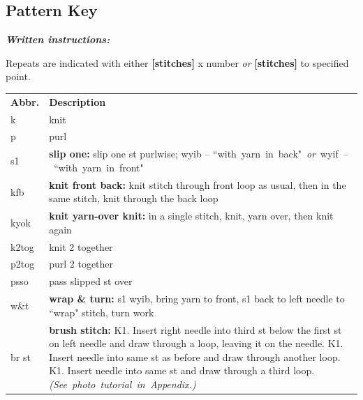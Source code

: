 \documentclass[12pt]{article}
\renewcommand{\arraystretch}{2}
\newcommand{\vocab}[1]{\emph{\textbf{#1}}} %
\begin{document}
\vfill

\subsection*{Pattern Key}

\vocab{Written instructions:} 

Repeats are indicated with either \textbf{[stitches]} x number \emph{or} \textbf{[stitches]} to specified point.
\vspace{-1em}
\small
\begin{center}
{\renewcommand{\arraystretch}{1.5}
\begin{tabular}{| C{0.1\linewidth}  p{0.9\linewidth} | }
\thickhline {} 
\textbf{Abbr.}	& \textbf{Description} \\ \thickhline
 k	&  knit \\
 p	& purl   \\ 
s1	& \textbf{slip one:} slip one st purlwise; wyib -- \mbox{``with yarn in back" \emph{or} \linebreak wyif -- ``with yarn in front"} \\
kfb	& \textbf{knit front back:} knit stitch through front loop as usual, then in the same stitch, knit through the back loop \\
kyok	& \textbf{knit yarn-over knit:} in a single stitch, knit, yarn over, then knit again \\
k2tog 	& knit 2 together \\
p2tog 	& purl 2 together \\
psso & pass slipped st over \\
w\&t & \textbf{wrap \& turn:} s1 wyib, bring yarn to front, s1 back to left needle to ``wrap" stitch, turn work \\
br st	& \textbf{brush stitch:} K1. Insert right needle into third st below the first st on left needle and draw through a loop, leaving it on the needle. K1. Insert needle into same st as before and draw through another loop. K1. Insert needle into same st and draw through a third loop. \mbox{\emph{(See photo tutorial in Appendix.)}} \\
\hline
\end{tabular}
}
\end{center}

\normalsize
\newpage
\end{document}
